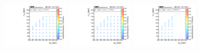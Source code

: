 \begin{figure}
\begin{center}
            \includegraphics[width=0.30\textwidth]{Supplementary/CMS-SUS-16-038_Figure-aux_023-g}
            \includegraphics[width=0.30\textwidth]{Supplementary/CMS-SUS-16-038_Figure-aux_023-h}
            \includegraphics[width=0.30\textwidth]{Supplementary/CMS-SUS-16-038_Figure-aux_023-i}


\end{center}
\end{figure}
